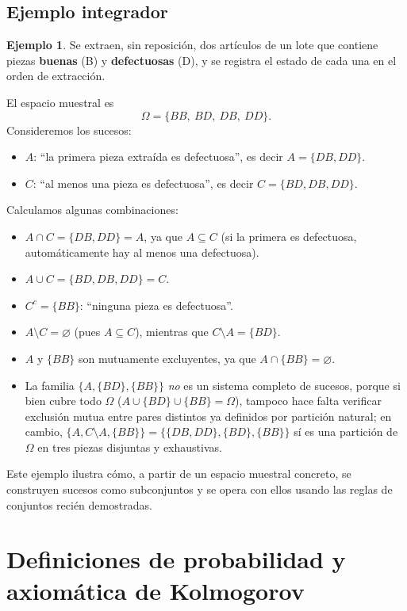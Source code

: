\documentclass[11pt,a4paper]{article}
\theoremstyle{plain}
\theoremstyle{definition}
\newtheorem{ejemplo}[teorema]{Ejemplo}
\theoremstyle{remark}
\begin{document}
\subsection{Ejemplo integrador}

\begin{ejemplo}
Se extraen, sin reposición, dos artículos de un lote que contiene piezas \textbf{buenas} (B) y \textbf{defectuosas} (D), y se registra el estado de cada una en el orden de extracción.

El espacio muestral es
\[
\Omega = \{BB,\ BD,\ DB,\ DD\}.
\]
Consideremos los sucesos:
\begin{itemize}
\item $A$: ``la primera pieza extraída es defectuosa'', es decir $A = \{DB, DD\}$.
\item $C$: ``al menos una pieza es defectuosa'', es decir $C = \{BD, DB, DD\}$.
\end{itemize}
Calculamos algunas combinaciones:
\begin{itemize}
\item $A \cap C = \{DB,DD\} = A$, ya que $A \subseteq C$ (si la primera es defectuosa, automáticamente hay al menos una defectuosa).
\item $A \cup C = \{BD,DB,DD\} = C$.
\item $C^c = \{BB\}$: ``ninguna pieza es defectuosa''.
\item $A \setminus C = \varnothing$ (pues $A\subseteq C$), mientras que $C\setminus A = \{BD\}$.
\item $A$ y $\{BB\}$ son mutuamente excluyentes, ya que $A \cap \{BB\} = \varnothing$.
\item La familia $\{A, \{BD\}, \{BB\}\}$ \emph{no} es un sistema completo de sucesos, porque si bien cubre todo $\Omega$ ($A\cup\{BD\}\cup\{BB\}=\Omega$), tampoco hace falta verificar exclusión mutua entre pares distintos ya definidos por partición natural; en cambio, $\{A, C\setminus A, \{BB\}\} = \{\{DB,DD\}, \{BD\}, \{BB\}\}$ sí es una partición de $\Omega$ en tres piezas disjuntas y exhaustivas.
\end{itemize}
Este ejemplo ilustra cómo, a partir de un espacio muestral concreto, se construyen sucesos como subconjuntos y se opera con ellos usando las reglas de conjuntos recién demostradas.
\end{ejemplo}

\newpage
\section{Definiciones de probabilidad y axiomática de Kolmogorov}
\end{document}
